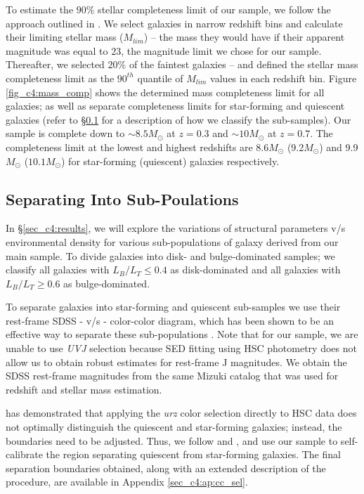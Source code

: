 To estimate the $90\%$ stellar completeness limit of our sample, we follow the approach outlined in \citet{pozzetti_10, Weigel16}. We select galaxies in narrow redshift bins and calculate their limiting stellar mass ($M_{lim}$) -- the mass they would have if their apparent magnitude was equal to $23$, the magnitude limit we chose for our sample. Thereafter, we selected $20\%$ of the faintest galaxies -- and defined the stellar mass completeness limit as the $90^{th}$ quantile  of $M_{lim}$ values in each redshift bin. Figure \ref{fig_c4:mass_comp} shows the determined mass completeness limit for all galaxies; as well as separate completeness limits for star-forming and quiescent galaxies (refer to \S \ref{sec_c4:sep_into_subsamples} for a description of how we classify the sub-samples). Our sample is complete down to $\sim8.5 M_{\odot}$ at $z=0.3$ and $\sim10M_{\odot}$ at $z=0.7$. The completeness limit at the lowest and highest redshifts are 8.6$M_{\odot}$ (9.2$M_\odot$) and 9.9$M_\odot$ ($10.1 M_\odot$) for star-forming (quiescent) galaxies respectively. 

\subsection{Separating Into Sub-Poulations} \label{sec_c4:sep_into_subsamples}
In \S \ref{sec_c4:results}, we will explore the variations of structural parameters v/s environmental density for various sub-populations of galaxy derived from our main sample. To divide galaxies into disk- and bulge-dominated samples; we classify all galaxies with $L_B/L_T \leq 0.4$ as disk-dominated and all galaxies with $L_B/L_T \geq 0.6$ as bulge-dominated. 

To separate galaxies into star-forming and quiescent sub-samples we use their rest-frame SDSS \uband{}-\rb{} v/s \rb{}-\zb{} color-color diagram, which has been shown to be an effective way to separate these sub-populations \citep[e.g.,][]{Holden12, Chang15, lopes_16, hsc_mass_size}. Note that for our sample, we are unable to use \textit{UVJ} selection because SED fitting using HSC \grizy{} photometry does not allow us to obtain robust estimates for rest-frame {J} magnitudes. We obtain the SDSS rest-frame magnitudes from the same Mizuki catalog that was used for redshift and stellar mass estimation. 

\citet{hsc_mass_size} has demonstrated that applying the \citet{Holden12} \textit{urz} color selection directly to HSC data does not optimally distinguish the quiescent and star-forming galaxies; instead, the boundaries need to be adjusted. Thus, we follow \citet{Kawin16} and \citet{hsc_mass_size}, and use our sample to self-calibrate the region separating quiescent from star-forming galaxies. The final separation boundaries obtained, along with an extended description of the procedure, are available in Appendix \ref{sec_c4:ap:cc_sel}.

